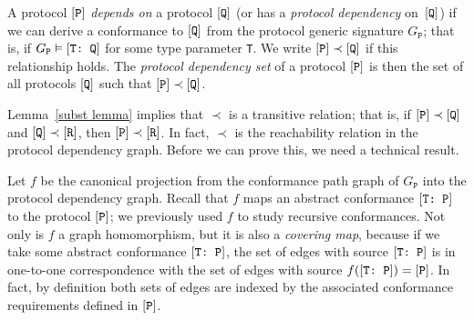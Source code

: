 \documentclass[../generics]{subfiles}
\begin{document}
\begin{definition}
A protocol $[\texttt{P}]$ \emph{depends on} a protocol $[\texttt{Q}]$ (or has a \emph{protocol dependency} on~$[\texttt{Q}]$) if we can derive a conformance to $[\texttt{Q}]$ from the protocol generic signature $G_\texttt{P}$; that is, if $G_\texttt{P}\vDash[\texttt{T:~Q}]$ for some type parameter \texttt{T}. We write $[\texttt{P}]\prec[\texttt{Q}]$ if this relationship holds. The \emph{protocol dependency set} of a protocol $[\texttt{P}]$ is then the set of all protocols $[\texttt{Q}]$ such that $[\texttt{P}]\prec[\texttt{Q}]$.
\end{definition}

Lemma~\ref{subst lemma} implies that $\prec$ is a transitive relation; that is, if $[\texttt{P}]\prec[\texttt{Q}]$ and $[\texttt{Q}]\prec[\texttt{R}]$, then $[\texttt{P}]\prec[\texttt{R}]$. In fact, $\prec$ is the reachability relation in the protocol dependency graph. Before we can prove this, we need a technical result.

\smallskip

Let $f$ be the canonical projection from the conformance path graph of $G_\texttt{P}$ into the protocol dependency graph. Recall that $f$ maps an abstract conformance $[\texttt{T:~P}]$ to the protocol $[\texttt{P}]$; we previously used $f$ to study recursive conformances. Not only is $f$ a graph homomorphism, but it is also a \emph{covering map}, because if we take some abstract conformance $[\texttt{T:~P}]$, the set of edges with source $[\texttt{T:~P}]$ is in one-to-one correspondence with the set of edges with source $f([\texttt{T:~P}])=[\texttt{P}]$. In fact, by definition both sets of edges are indexed by the associated conformance requirements defined in $[\texttt{P}]$.
\end{document}
